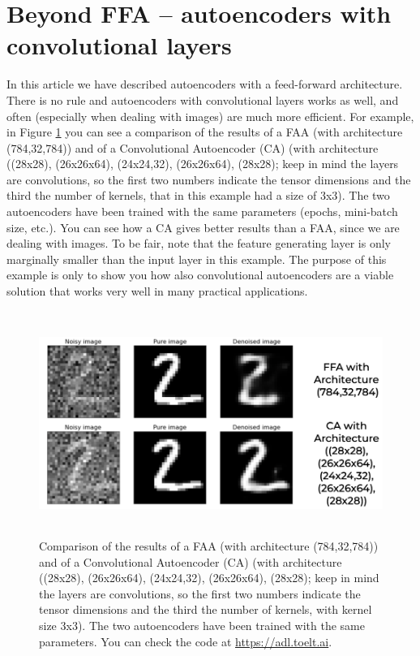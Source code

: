 \documentclass[12pt,a4]{article}
\begin{document}
\section{Beyond FFA – autoencoders with convolutional layers}

In this article we have described autoencoders with a feed-forward architecture. There is no rule and autoencoders with convolutional layers works as well, and often (especially when dealing with images) are much more efficient. For example, in Figure \ref{fig:recon6} you can see a comparison of the results of a FAA (with architecture (784,32,784)) and of a Convolutional Autoencoder (CA) (with architecture ((28x28), (26x26x64), (24x24,32), (26x26x64), (28x28); keep in mind the layers are convolutions, so the first two numbers indicate the tensor dimensions and the third the number of kernels, that in this example had a size of 3x3). The two autoencoders have been trained with the same parameters (epochs, mini-batch size, etc.). You can see how a CA gives better results than a FAA, since we are dealing with images. To be fair, note that the feature generating layer is only marginally smaller than the input layer in this example. The purpose of this example is only to show you how also convolutional autoencoders are a viable solution that works very well in many practical applications.
\begin{figure}[hbt]
\centering
\includegraphics[width=12.61cm,height=7.3cm]{./images/image15.png}
\caption{Comparison of the results of a FAA (with architecture (784,32,784)) and of a Convolutional Autoencoder (CA) (with architecture ((28x28), (26x26x64), (24x24,32), (26x26x64), (28x28); keep in mind the layers are convolutions, so the first two numbers indicate the tensor dimensions and the third the number of kernels, with kernel size 3x3). The two autoencoders have been trained with the same parameters. You can check the code at \url{https://adl.toelt.ai}.}\label{fig:recon6}
\end{figure}
\end{document}
